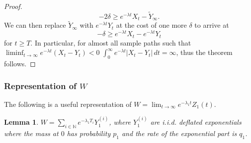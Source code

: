 \documentclass{article}
\numberwithin{equation}{section}
\newtheorem{lemma}{Lemma}
\begin{document}
\begin{proof}
  \[-2\delta\geq e^{-\lambda t}X_t-\widetilde{Y}_\infty.\]
We can then replace $\widetilde{Y}_\infty$ with $e^{-\lambda t}Y_t$ at the cost of one more $\delta$ to arrive at 
  \[-\delta\geq e^{-\lambda t}X_t-e^{-\lambda t}Y_t\]
for $t\geq T$. In particular, for almost all sample paths such that $\liminf_{t\to\infty}e^{-\lambda t}(X_t-Y_t)<0$ $\int_0^\infty e^{-\lambda t}|X_t-Y_t|\,dt=\infty$, thus the theorem follows.


\end{proof}

\subsubsection{Representation of $W$}\label{app:W_representation}

The following is a useful representation of $W=\lim_{t\to\infty} e^{-\lambda_1 t}Z_1(t)$.

\begin{lemma}
  $W=\sum_{i\in \mathbb{N}} e^{-\lambda_1 T_i}Y_1^{(i)}$, where $Y_1^{(i)}$ are i.i.d. deflated exponentials where the mass at $0$ has probability $p_1$ and the rate of the exponential part is $q_1$.
\end{lemma}
\end{document}
